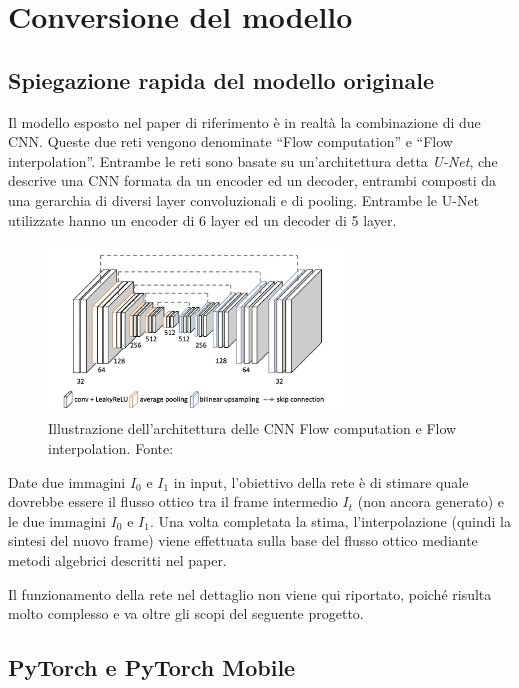 \chapter{Conversione del modello}

\section{Spiegazione rapida del modello originale}

Il modello esposto nel paper di riferimento è in realtà la combinazione di due CNN. Queste due reti vengono denominate
``Flow computation'' e ``Flow interpolation''. Entrambe le reti sono basate su un'architettura detta \emph{U-Net}, che
descrive una CNN formata da un encoder ed un decoder, entrambi composti da una gerarchia di diversi layer convoluzionali
e di pooling.
Entrambe le U-Net utilizzate hanno un encoder di 6 layer ed un decoder di 5 layer.

\begin{figure}[h!]
    \includegraphics[width=0.7\textwidth]{img/architettura_slomo.jpg}
    \centering
    \caption{Illustrazione dell'architettura delle CNN Flow computation e Flow interpolation. Fonte: \cite{paper_superslomo}}
    \label{fig:architettura_slomo}
\end{figure}

Date due immagini $I_0$ e $I_1$ in input, l'obiettivo della rete è di stimare quale dovrebbe essere il flusso ottico tra 
il frame intermedio $I_t$ (non ancora generato) e le due immagini $I_0$ e $I_1$. Una volta completata la stima,
l'interpolazione (quindi la sintesi del nuovo frame) viene effettuata sulla base del flusso ottico mediante metodi 
algebrici descritti nel paper.

Il funzionamento della rete nel dettaglio non viene qui riportato, poiché risulta molto complesso e va oltre gli scopi
del seguente progetto.

\section{PyTorch e PyTorch Mobile}

